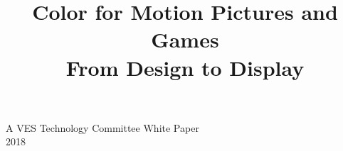 \documentclass[a4paper]{report}
\title{\Large Color for Motion Pictures and Games\\ \small From Design to Display}
\affiliation{\mbox{}}
\begin{document}
\maketitle

\large A VES Technology Committee White Paper\\
2018



\tableofcontents












\end{document}
